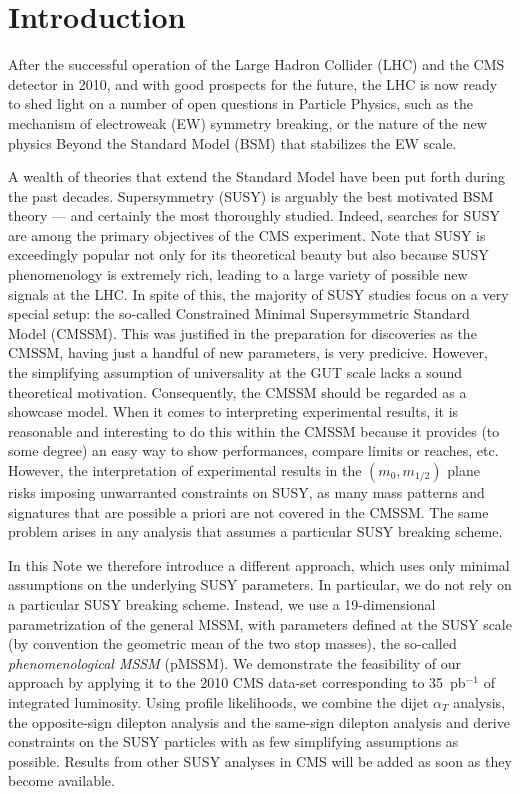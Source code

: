 \section{Introduction}
\label{sec:intro}

After the successful operation of the Large Hadron Collider (LHC) and the CMS detector
in 2010, and with good prospects for the future, the LHC is now ready to shed light on a number 
of open questions in Particle Physics, 
such as the mechanism of electroweak (EW) symmetry breaking, or the nature 
of the new physics Beyond the Standard Model (BSM) that stabilizes the EW scale. 

A wealth of theories that extend the Standard Model have been put forth during the past decades. Supersymmetry (SUSY) is
arguably the best motivated BSM theory --- and certainly the most 
thoroughly studied. 
Indeed, searches for SUSY are among the primary objectives of the 
CMS experiment. Note that SUSY is exceedingly popular not 
only for its theoretical beauty but also because SUSY phenomenology 
is extremely rich, 
leading to a large variety of possible new signals at the LHC. 
In spite of this, the majority of SUSY studies focus on a very special 
setup: the so-called Constrained Minimal Supersymmetric Standard Model (CMSSM). 
This was justified in the preparation for discoveries as the CMSSM, 
having just a handful of new parameters, is very predicive. However, 
the simplifying assumption of universality at the GUT scale lacks a sound 
theoretical motivation. Consequently, the CMSSM should be regarded as a showcase 
model. When it comes to interpreting experimental results, it is reasonable and interesting to do this within the CMSSM because it 
provides (to some degree) an easy way to show performances, 
compare limits or reaches, etc. However, the interpretation of experimental results in the 
$(m_0,m_{1/2})$ plane risks imposing unwarranted constraints on SUSY, as many 
mass patterns and signatures that are possible a priori are not covered in the CMSSM. 
The same problem arises in any analysis that assumes a particular 
SUSY breaking scheme. 

In this Note we therefore introduce a different approach, which uses only 
minimal assumptions on the underlying SUSY parameters. In particular, we do 
not rely on a particular SUSY breaking scheme. Instead, we use a 19-dimensional 
parametrization of the general MSSM, with parameters defined at the SUSY scale 
(by convention the geometric mean of the two stop masses), 
the so-called \emph{phenomenological MSSM} (pMSSM). 
We demonstrate the feasibility of our approach by applying it to 
the 2010 CMS data-set corresponding to 35~pb$^{-1}$ of integrated luminosity.  
Using profile likelihoods, we combine 
the dijet $\alpha_T$ analysis, the opposite-sign dilepton 
analysis and the same-sign dilepton analysis and derive constraints 
on the SUSY particles with as few simplifying assumptions as possible.
Results from other SUSY analyses in CMS will be added as soon as they become available.

